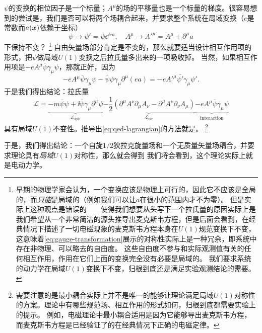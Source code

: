 $\psi$的变换的相位因子是一个标量；$A^\mu$的场的平移量也是一个标量的梯度。很容易想到的尝试是，我们是否可以将两个场耦合起来，并要求整个系统在局域变换（$e$是常数而$a(\vb*{x})$依赖于坐标）
\begin{equation}
    \psi \longrightarrow \psi' = \psi \ee^{\ii e a}, \quad A^\mu \longrightarrow A'^\mu = A^\mu + \partial^\mu a
    \label{eq:gauge-transformation}
\end{equation}
下保持不变？%
\footnote{早期的物理学家会认为，一个变换应该是物理上可行的，因此它不应该是全局的，而\emph{只能}是局域的（例如我们可以让$a$在很小的范围内才不为零）。
但是实际上这种观点是错误的——使得我们想要从头写下一个拉氏量的原因实际上是我们希望从一个非常简洁的源头推导出麦克斯韦方程，但是后面会看到，在经典情况下描述了一切电磁现象的麦克斯韦方程本身在$U(1)$规范变换下不变，这意味着\eqref{eq:gauge-transformation}展示的对称性实际上是一种冗余，即系统中存在非物理、可以略去的自由度。
这些自由度不参与和实际观测值有关的任何相互作用，作用在它们上面的变换完全没有必要是局域的。
我们要求系统的动力学在局域$U(1)$变换下不变，归根到底还是满足实验观测结论的需要。
}%
自由矢量场部分肯定是不变的，那么就要适当设计相互作用项的形式，把$\psi$做局域$U(1)$变换之后拉氏量多出来的一项吸收掉。
当然，如果相互作用项是$- e A^\mu \bar{\psi} \gamma_\mu \psi$，那就正好，因为
\[
    - e A^\mu \bar{\psi} \gamma_\mu \psi - \bar{\psi} \psi \gamma_\mu \partial^\mu (e a) = - e A'^\mu \bar{\psi'} \gamma_\mu \psi'.
\]
于是我们得出结论：拉氏量
\begin{equation}
    \mathcal{L} = 
    \underbrace{- m \bar{\psi} \psi + \ii \bar{\psi} \gamma_\mu \partial^\mu \psi }_{\mathcal{L}_\text{spin}}
    \underbrace{- \frac{1}{2} (\partial^\mu A^\nu \partial_\mu A_\nu - \partial^\mu A^\nu \partial_\nu A_\mu)}_{\mathcal{L}_\text{vec}}
    \underbrace{- e A^\mu \bar{\psi} \gamma_\mu \psi}_\text{interaction}
    \label{eq:qed-lagrangian}
\end{equation}
具有局域$U(1)$不变性。推导出\eqref{eq:qed-lagrangian}的方法就是。%
\footnote{需要注意的是最小耦合实际上并不是唯一的能够让理论满足局域$U(1)$对称性的方案。理论中有哪些规范场、相互作用的形式如何，归根到底都需要实验上的提示。
例如，电磁理论中最小耦合适用是因为它能够导出麦克斯韦方程，而麦克斯韦方程是已经验证了的在经典情况下正确的电磁定律。}%

于是，我们得出结论：一个自旋$1/2$狄拉克旋量场和一个无质量矢量场耦合，并要求理论具有\emph{局域}$U(1)$对称性，那么就会得到
我们将会看到，这个理论实际上就是电动力学。

